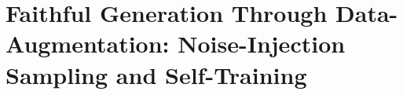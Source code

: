 \section{Faithful Generation Through Data-Augmentation: Noise-Injection Sampling and Self-Training}
\label{sec:nlgfg}


